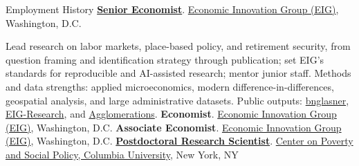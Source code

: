 \begin{rubric}{Employment History}
%
    \textbf{\href{https://eig.org/about-us/executive-team-staff/ben-glasner/}{Senior Economist}}. \href{https://eig.org/}{Economic Innovation Group (EIG)}, Washington, D.C.
    \par Lead research on labor markets, place-based policy, and retirement security, from question framing and identification strategy through publication; set EIG's standards for reproducible and AI-assisted research; mentor junior staff. Methods and data strengths: applied microeconomics, modern difference-in-differences, geospatial analysis, and large administrative datasets. Public outputs: \href{https://github.com/bnglasner}{bnglasner}, \href{https://github.com/EIG-Research}{EIG-Research}, and \href{https://agglomerations.eig.org/}{Agglomerations}.
%
    \textbf{Economist}. \href{https://eig.org/}{Economic Innovation Group (EIG)}, Washington, D.C.
%
    \textbf{Associate Economist}. \href{https://eig.org/}{Economic Innovation Group (EIG)}, Washington, D.C.
\entry*[2021 - 2022]%
    \textbf{\href{https://povertycenter.columbia.edu/people}{Postdoctoral Research Scientist}}. \href{https://povertycenter.columbia.edu/people}{Center on Poverty and Social Policy, Columbia University}, New York, NY
\end{rubric}

